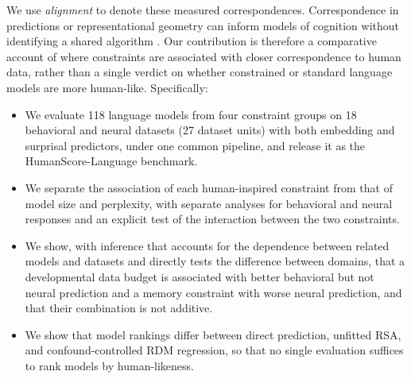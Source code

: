 We use \emph{alignment} to denote these measured correspondences. Correspondence in predictions or representational geometry can inform models of cognition without identifying a shared algorithm \citep{marr1982vision}. Our contribution is therefore a comparative account of where constraints are associated with closer correspondence to human data, rather than a single verdict on whether constrained or standard language models are more human-like. Specifically:
\begin{itemize}
    \item We evaluate 118 language models from four constraint groups on 18 behavioral and neural datasets (27 dataset units) with both embedding and surprisal predictors, under one common pipeline, and release it as the HumanScore-Language benchmark.
    \item We separate the association of each human-inspired constraint from that of model size and perplexity, with separate analyses for behavioral and neural responses and an explicit test of the interaction between the two constraints.
    \item We show, with inference that accounts for the dependence between related models and datasets and directly tests the difference between domains, that a developmental data budget is associated with better behavioral but not neural prediction and a memory constraint with worse neural prediction, and that their combination is not additive.
    \item We show that model rankings differ between direct prediction, unfitted RSA, and confound-controlled RDM regression, so that no single evaluation suffices to rank models by human-likeness.
\end{itemize}

